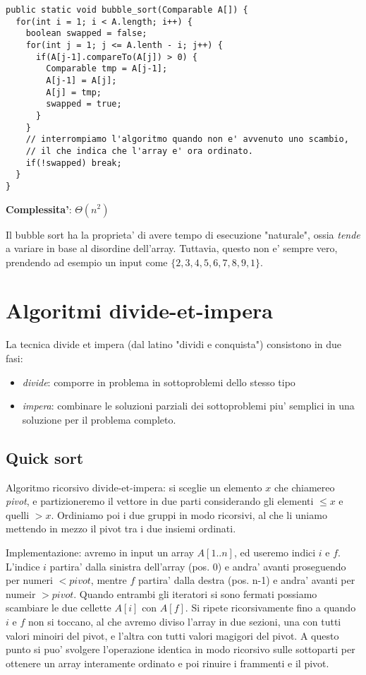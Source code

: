 \documentclass{article}
\begin{document}
\begin{lstlisting}
public static void bubble_sort(Comparable A[]) {
  for(int i = 1; i < A.length; i++) {
    boolean swapped = false;
    for(int j = 1; j <= A.lenth - i; j++) {
      if(A[j-1].compareTo(A[j]) > 0) {
        Comparable tmp = A[j-1];
        A[j-1] = A[j];
        A[j] = tmp;
        swapped = true;
      }
    }
    // interrompiamo l'algoritmo quando non e' avvenuto uno scambio,
    // il che indica che l'array e' ora ordinato.
    if(!swapped) break;
  }
}
\end{lstlisting}

\textbf{Complessita'}: $\Theta(n^2)$

Il bubble sort ha la proprieta' di avere tempo di esecuzione "naturale", ossia
\emph{tende} a variare in base al disordine dell'array. Tuttavia, questo non e'
sempre vero, prendendo ad esempio un input come $\{2,3,4,5,6,7,8,9,1\}$.

\section{Algoritmi divide-et-impera}

La tecnica divide et impera (dal latino "dividi e conquista") consistono in due fasi:
\begin{itemize}
  \item \emph{divide}: comporre in problema in sottoproblemi dello stesso tipo
  \item \emph{impera}: combinare le soluzioni parziali dei sottoproblemi piu'
    semplici in una soluzione per il problema completo.
\end{itemize}

\subsection{Quick sort}

Algoritmo ricorsivo divide-et-impera: si sceglie un elemento $x$ che chiamereo \emph{pivot},
e partizioneremo il vettore in due parti considerando gli elementi $\leq x$ e quelli $> x$.
Ordiniamo poi i due gruppi in modo ricorsivi, al che li uniamo mettendo in mezzo il pivot tra
i due insiemi ordinati.

Implementazione: avremo in input un array $A[1..n]$, ed useremo indici $i$ e $f$.
L'indice $i$ partira' dalla sinistra dell'array (pos. 0) e andra' avanti proseguendo
per numeri $< pivot$, mentre $f$ partira' dalla destra (pos. n-1) e andra' avanti
per numeir $> pivot$. Quando entrambi gli iteratori si sono fermati possiamo scambiare
le due cellette $A[i]$ con $A[f]$. Si ripete ricorsivamente fino a quando $i$ e $f$
non si toccano, al che avremo diviso l'array in due sezioni, una con tutti valori
minoiri del pivot, e l'altra con tutti valori magigori del pivot. A questo punto si puo'
svolgere l'operazione identica in modo ricorsivo sulle sottoparti per ottenere un
array interamente ordinato e poi rinuire i frammenti e il pivot.
\end{document}
